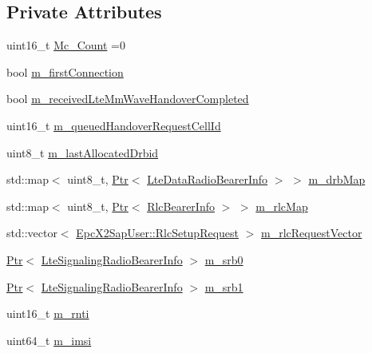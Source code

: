 \subsection*{Private Attributes}
\begin{DoxyCompactItemize}
\item 
uint16\+\_\+t \hyperlink{classns3_1_1UeManager_a511c8f672390b1520ba134623782ac81}{Mc\+\_\+\+Count} =0
\item 
bool \hyperlink{classns3_1_1UeManager_a80bbce0e682b9f64dd49292c0388d79d}{m\+\_\+first\+Connection}
\item 
bool \hyperlink{classns3_1_1UeManager_add440b9081bc11490fc5b7cf72c45115}{m\+\_\+received\+Lte\+Mm\+Wave\+Handover\+Completed}
\item 
uint16\+\_\+t \hyperlink{classns3_1_1UeManager_a70f73047c76f4fd1be2cc3665c381704}{m\+\_\+queued\+Handover\+Request\+Cell\+Id}
\item 
uint8\+\_\+t \hyperlink{classns3_1_1UeManager_a6684861c62ae763709683b4940bf0ff3}{m\+\_\+last\+Allocated\+Drbid}
\item 
std\+::map$<$ uint8\+\_\+t, \hyperlink{classns3_1_1Ptr}{Ptr}$<$ \hyperlink{classns3_1_1LteDataRadioBearerInfo}{Lte\+Data\+Radio\+Bearer\+Info} $>$ $>$ \hyperlink{classns3_1_1UeManager_a18499c025730b63c73e5d93effff57aa}{m\+\_\+drb\+Map}
\item 
std\+::map$<$ uint8\+\_\+t, \hyperlink{classns3_1_1Ptr}{Ptr}$<$ \hyperlink{classns3_1_1RlcBearerInfo}{Rlc\+Bearer\+Info} $>$ $>$ \hyperlink{classns3_1_1UeManager_a64f37a901db7a322552ba08d87e65770}{m\+\_\+rlc\+Map}
\item 
std\+::vector$<$ \hyperlink{structns3_1_1EpcX2Sap_1_1RlcSetupRequest}{Epc\+X2\+Sap\+User\+::\+Rlc\+Setup\+Request} $>$ \hyperlink{classns3_1_1UeManager_a998bc5ed29bd7edfa4c683adcfc7cabb}{m\+\_\+rlc\+Request\+Vector}
\item 
\hyperlink{classns3_1_1Ptr}{Ptr}$<$ \hyperlink{classns3_1_1LteSignalingRadioBearerInfo}{Lte\+Signaling\+Radio\+Bearer\+Info} $>$ \hyperlink{classns3_1_1UeManager_a8125951721a3aeefbf6ea5af111f2f3f}{m\+\_\+srb0}
\item 
\hyperlink{classns3_1_1Ptr}{Ptr}$<$ \hyperlink{classns3_1_1LteSignalingRadioBearerInfo}{Lte\+Signaling\+Radio\+Bearer\+Info} $>$ \hyperlink{classns3_1_1UeManager_a196852199b6a48c365eadfec4ba89935}{m\+\_\+srb1}
\item 
uint16\+\_\+t \hyperlink{classns3_1_1UeManager_a5a72b4fe818f21993bd7f05d7e2c4f83}{m\+\_\+rnti}
\item 
uint64\+\_\+t \hyperlink{classns3_1_1UeManager_a868dda076ecfc1d4202e357c16223d84}{m\+\_\+imsi}

\end{DoxyCompactItemize}
